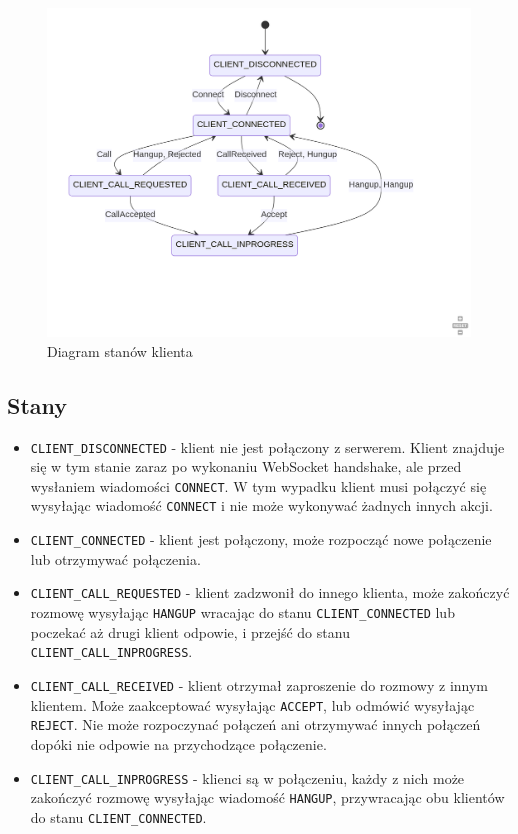 \begin{figure}[H]
      \centering
      \includegraphics[width=.8\textwidth]{img/rozdzial3/state-diagram-2}
      \caption{Diagram stanów klienta}
      \label{fig:client_states}
\end{figure}

\subsection*{Stany}

\begin{itemize}
      \item \verb|CLIENT_DISCONNECTED| - klient nie jest połączony z serwerem. Klient znajduje się w
            tym stanie zaraz po wykonaniu WebSocket handshake, ale przed wysłaniem wiadomości
            \verb|CONNECT|. W tym wypadku klient musi połączyć się wysyłając wiadomość \verb|CONNECT|
            i nie może wykonywać żadnych innych akcji.
      \item \verb|CLIENT_CONNECTED| - klient jest połączony, może rozpocząć nowe połączenie lub
            otrzymywać połączenia.
      \item \verb|CLIENT_CALL_REQUESTED| - klient zadzwonił do innego klienta, może zakończyć rozmowę
            wysyłając \verb|HANGUP| wracając do stanu \verb|CLIENT_CONNECTED| lub poczekać aż drugi
            klient odpowie, i przejść do stanu \verb|CLIENT_CALL_INPROGRESS|.
      \item \verb|CLIENT_CALL_RECEIVED| - klient otrzymał zaproszenie do rozmowy z innym klientem.
            Może zaakceptować wysyłając \verb|ACCEPT|, lub odmówić wysyłając \verb|REJECT|. Nie może
            rozpoczynać połączeń ani otrzymywać innych połączeń dopóki nie odpowie na przychodzące
            połączenie.
      \item \verb|CLIENT_CALL_INPROGRESS| - klienci są w połączeniu, każdy z nich może zakończyć
            rozmowę wysyłając wiadomość \verb|HANGUP|, przywracając obu klientów do stanu
            \verb|CLIENT_CONNECTED|.
\end{itemize}

